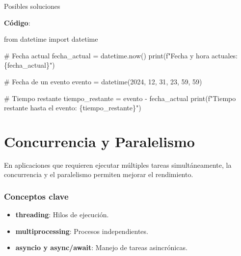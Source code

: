 \documentclass[
  a4paper,
  DIV=11,
  numbers=noendperiod,
  onepage,
  openany]{scrreprt}
\newenvironment{Shaded}{\begin{snugshade}}{\end{snugshade}}
\newcommand{\BuiltInTok}[1]{\textcolor[rgb]{0.00,0.23,0.31}{#1}}
\newcommand{\CommentTok}[1]{\textcolor[rgb]{0.37,0.37,0.37}{#1}}
\newcommand{\DecValTok}[1]{\textcolor[rgb]{0.68,0.00,0.00}{#1}}
\newcommand{\ImportTok}[1]{\textcolor[rgb]{0.00,0.46,0.62}{#1}}
\newcommand{\NormalTok}[1]{\textcolor[rgb]{0.00,0.23,0.31}{#1}}
\newcommand{\OperatorTok}[1]{\textcolor[rgb]{0.37,0.37,0.37}{#1}}
\newcommand{\SpecialCharTok}[1]{\textcolor[rgb]{0.37,0.37,0.37}{#1}}
\newcommand{\SpecialStringTok}[1]{\textcolor[rgb]{0.13,0.47,0.30}{#1}}
\begin{document}
Posibles soluciones

\textbf{Código}:

\begin{Shaded}
\begin{Highlighting}[]
\ImportTok{from}\NormalTok{ datetime }\ImportTok{import}\NormalTok{ datetime}

\CommentTok{\# Fecha actual}
\NormalTok{fecha\_actual }\OperatorTok{=}\NormalTok{ datetime.now()}
\BuiltInTok{print}\NormalTok{(}\SpecialStringTok{f"Fecha y hora actuales: }\SpecialCharTok{\{}\NormalTok{fecha\_actual}\SpecialCharTok{\}}\SpecialStringTok{"}\NormalTok{)}

\CommentTok{\# Fecha de un evento}
\NormalTok{evento }\OperatorTok{=}\NormalTok{ datetime(}\DecValTok{2024}\NormalTok{, }\DecValTok{12}\NormalTok{, }\DecValTok{31}\NormalTok{, }\DecValTok{23}\NormalTok{, }\DecValTok{59}\NormalTok{, }\DecValTok{59}\NormalTok{)}

\CommentTok{\# Tiempo restante}
\NormalTok{tiempo\_restante }\OperatorTok{=}\NormalTok{ evento }\OperatorTok{{-}}\NormalTok{ fecha\_actual}
\BuiltInTok{print}\NormalTok{(}\SpecialStringTok{f"Tiempo restante hasta el evento: }\SpecialCharTok{\{}\NormalTok{tiempo\_restante}\SpecialCharTok{\}}\SpecialStringTok{"}\NormalTok{)}
\end{Highlighting}
\end{Shaded}

\chapter{Concurrencia y Paralelismo}\label{concurrencia-y-paralelismo}

En aplicaciones que requieren ejecutar múltiples tareas simultáneamente,
la concurrencia y el paralelismo permiten mejorar el rendimiento.

\subsection{Conceptos clave}\label{conceptos-clave-8}

\begin{itemize}
\item
  \textbf{threading}: Hilos de ejecución.
\item
  \textbf{multiprocessing}: Procesos independientes.
\item
  \textbf{asyncio y async/await}: Manejo de tareas asincrónicas.
\end{itemize}
\end{document}
